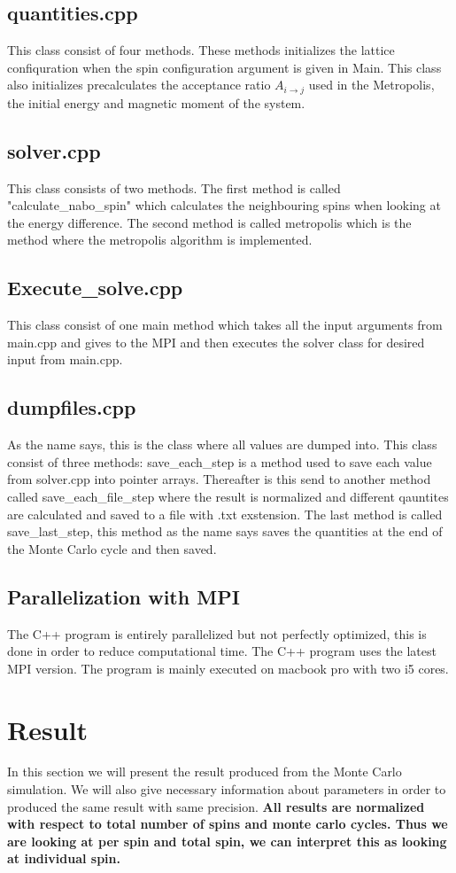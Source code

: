 \documentclass[a4paper, 10pt]{article}
\begin{document}
\subsection{quantities.cpp}
This class consist of four methods. These methods initializes the lattice confiquration when the spin configuration argument is given in Main. This class also initializes precalculates
the acceptance ratio $A_{i \to j}$ used in the Metropolis, the initial energy and magnetic moment of the system.
\subsection{solver.cpp} This class consists of two methods.
The first method is called "calculate\_nabo\_spin" which calculates the neighbouring spins when looking at the energy difference.
The second method is called metropolis  which is the method where the metropolis algorithm is implemented.
\subsection{Execute\_solve.cpp}
This class consist of one main method which takes all the input arguments from main.cpp and gives to the MPI and then executes
the solver class for desired input from main.cpp.
\subsection{dumpfiles.cpp} As the name says, this is the class where all values are dumped into. This class consist of three methods:
save\_each\_step is a method used to save each value from solver.cpp into pointer arrays. Thereafter is this send to another
method called save\_each\_file\_step where the result is normalized and different qauntites are calculated and saved to a file with .txt exstension.
The last method is called save\_last\_step, this method as the name says saves the quantities at the end of the Monte Carlo cycle and then saved.
\subsection{Parallelization with MPI} The C++ program is entirely parallelized but not perfectly optimized,
this is done in order to reduce computational time. The C++ program uses the latest MPI version. The program is mainly
executed on macbook pro with two i5 cores.
\section{Result} In this section we will present the result produced from the Monte Carlo simulation.
We will also give necessary information about parameters in order to produced the same result with same precision.
\textbf{All results are normalized with respect to total number of spins and monte carlo cycles. Thus we are looking at per spin and total spin, we can interpret this
as looking at individual spin.}
\end{document}
